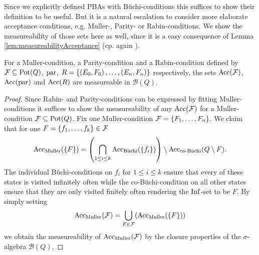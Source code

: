 Since we explicitly defined \acp{PBA} with Büchi-conditions this suffices to
show their definition to be useful. But it is a natural escalation to consider
more elaborate acceptance conditions, e.g. Muller-, Parity- or
Rabin-conditions. We show the measureability of those sets here as well, since
it is a easy consequence of Lemma \ref{lem:measureabilityAcceptance} (cp. again
\cite[Proposition 6]{RandAutoInfTrees}).
\begin{corollary}
  For a Muller-condition, a Parity-condition and a Rabin-condition
  defined by $\mathcal{F}\subseteq\operatorname{Pot}(Q)$, $\operatorname{par}$, 
  $R = \left\{\left(E_{0}, F_{0}\right),\dots,\left(E_{n}, F_{n}\right)\right\}$ respectively, the 
  sets $\operatorname{Acc}(\mathcal{F})$, $\operatorname{Acc}(\operatorname{par})$ and $\operatorname{Acc}(R)$ are measureable in 
  $\mathcal{B}(Q)$.
  \label{cor:borelAcceptance}
\end{corollary}
\begin{proof}
  Since Rabin- and Parity-conditions can be expressed by fitting 
  Muller-conditions it suffices to show the measureability of any 
  $\operatorname{Acc}(\mathcal{F})$ for a Muller-condition $\mathcal{F}\subseteq\operatorname{Pot}(Q)$.
  Fix one Muller-condition $\mathcal{F} = \left\{F_{1},\dots,F_{n}\right\}$. We claim
  that for one $F = \left\{f_{1},\dots, f_{k}\right\}\in\mathcal{F}$
  \begin{equation*}
    \operatorname{Acc}_{\operatorname{Muller}}(\left\{F\right\}) = \left(
      \bigcap\limits_{1\leq i\leq k}\operatorname{Acc}_{\operatorname{B\ddot{u}chi}}(\left\{f_{i}\right\})\right)\setminus
      \operatorname{Acc}_{\operatorname{co-B\ddot{u}chi}}(Q\setminus F).
  \end{equation*}
  The individual Büchi-conditions on $f_{i}$ for $1\leq i\leq k$ ensure that 
  every of these states is visited infinitely often while the 
  co-Büchi-condition on all other states ensure that they are only visited
  finitely often rendering the $\operatorname{Inf}$-set to be $F$. By simply setting
  \begin{equation*}
    \operatorname{Acc}_{\operatorname{Muller}}(\mathcal{F}) = \bigcup\limits_{F\in\mathcal{F}}(
    \operatorname{Acc}_{\operatorname{Muller}}(\left\{F\right\}))
  \end{equation*}
  we obtain the measureability of $\operatorname{Acc}_{\operatorname{Muller}}(\mathcal{F})$ by the closure
  properties of the $\sigma$-algebra $\mathcal{B}(Q)$.
\end{proof}

